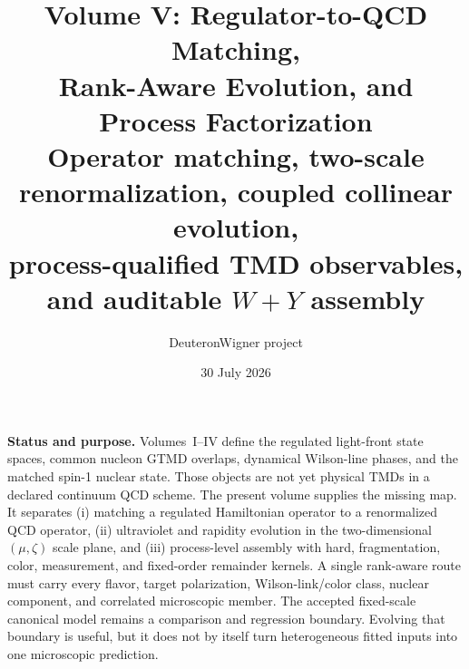 \documentclass[11pt]{article}
\title{\vspace{-1.0cm}
{\color{navy}\bfseries Volume V: Regulator-to-QCD Matching,\\[2mm]
Rank-Aware Evolution, and Process Factorization}\\[4mm]
\large Operator matching, two-scale renormalization, coupled collinear evolution,\\
process-qualified TMD observables, and auditable \(W+Y\) assembly}
\author{DeuteronWigner project}
\date{30 July 2026}
\begin{document}
\maketitle

\begin{center}
\begin{minipage}{0.94\textwidth}
\colorbox{softblue}{\parbox{0.96\textwidth}{
\textbf{Status and purpose.}
Volumes~I--IV define the regulated light-front state spaces, common nucleon
GTMD overlaps, dynamical Wilson-line phases, and the matched spin-1 nuclear
state.  Those objects are not yet physical TMDs in a declared continuum QCD
scheme.  The present volume supplies the missing map.  It separates
(i) matching a regulated Hamiltonian operator to a renormalized QCD operator,
(ii) ultraviolet and rapidity evolution in the two-dimensional
\((\mu,\zeta)\) scale plane, and (iii) process-level assembly with hard,
fragmentation, color, measurement, and fixed-order remainder kernels.  A
single rank-aware route must carry every flavor, target polarization,
Wilson-link/color class, nuclear component, and correlated microscopic member.
The accepted fixed-scale canonical model remains a comparison and regression
boundary.  Evolving that boundary is useful, but it does not by itself turn
heterogeneous fitted inputs into one microscopic prediction.
}}
\end{minipage}
\end{center}
\end{document}
